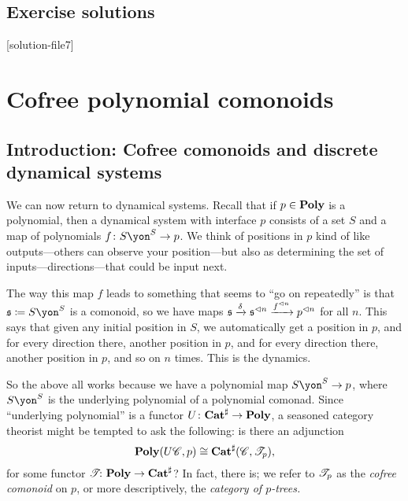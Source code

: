 \documentclass[Book-Poly]{subfiles}
\begin{document}





\section{Exercise solutions}
{\footnotesize
}

[solution-file7]

\chapter{Cofree polynomial comonoids}\label{sec.cofree}

\section{Introduction: Cofree comonoids and discrete dynamical systems}

We can now return to dynamical systems. Recall that if $p\in\mathbf{Poly}$ is a polynomial, then a dynamical system with interface $p$ consists of a set $S$ and a map of polynomials $f\colon S\yon^S\to p$. We think of positions in $p$ kind of like outputs---others can observe your position---but also as determining the set of inputs---directions---that could be input next.

The way this map $f$ leads to something that seems to ``go on repeatedly'' is that $\ema{s}\coloneqq S\yon^S$ is a comonoid, so we have maps $\mathfrak{s}\xrightarrow{\delta}\mathfrak{s}^{\lhd n}\xrightarrow{f^{\lhd n}}p^{\lhd n}$ for all $n$. This says that given any initial position in $S$, we automatically get a position in $p$, and for every direction there, another position in $p$, and for every direction there, another position in $p$, and so on $n$ times. This is the dynamics.

So the above all works because we have a polynomial map $S\yon^S\to p$, where $S\yon^S$ is the underlying polynomial of a polynomial comonad. Since ``underlying polynomial'' is a functor $U\colon\mathbf{Cat}^\sharp\to\mathbf{Poly}$, a seasoned category theorist might be tempted to ask the following: is there an adjunction
\[
\mathbf{Poly}(U\mathscr{C},p)\cong\mathbf{Cat}^\sharp(\mathscr{C},\mathscr{T}_{p}),
\]
for some functor $\mathscr{T}_{}\colon\mathbf{Poly}\to\mathbf{Cat}^\sharp$? In fact, there is; we refer to $\mathscr{T}_{p}$ as the \emph{cofree comonoid} on $p$, or more descriptively, the \emph{category of $p$-trees.}
\end{document}
